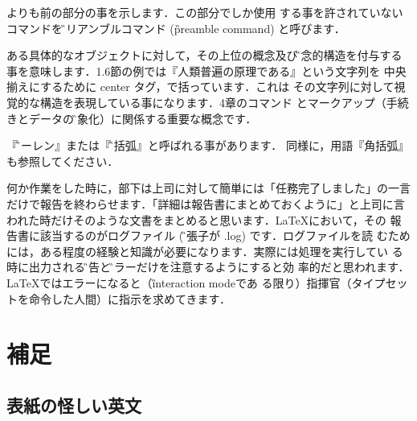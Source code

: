 \begin{description}
\verb|| よりも前の部分の事を示します．この部分でしか使用
する事を許されていないコマンドを\G{プリアンブルコマンド}
 (\G{preamble command}) と呼びます．

\end{description}
\begin{description}
ある具体的なオブジェクトに対して，その上位の概念及び\G{概念的構造}を付与する
事を意味します．1.6節の例では『人類普遍の原理である』という文字列を
中央揃えにするために center タグ，で括っています．これは
その文字列に対して視覚的な構造を表現している事になります．4章のコマンド
とマークアップ（手続きとデータの\G{抽象化}）に関係する重要な概念です．

『\G{パーレン}』または『\G{小括弧}』と呼ばれる事があります．
同様に，用語『角括弧』も参照してください．

\end{description}
%
\begin{description}
何か作業をした時に，部下は上司に対して簡単には「任務完了しました」の一言
だけで報告を終わらせます．「詳細は報告書にまとめておくように」と上司に言
われた時だけそのような文書をまとめると思います．\LaTeX において，その
報告書に該当するのがログファイル (\G{拡張子}が .log) です．ログファイルを読
むためには，ある程度の経験と知識が必要になります．実際には処理を実行してい
る時に出力される\G{警告}と\G{エラー}だけを注意するようにすると効
率的だと思われます．\LaTeX ではエラーになると（\G{interaction mode}であ
る限り）指揮官（タイプセットを命令した人間）に指示を求めてきます．
\end{description}
%

\onecolumn

\section{補足}

\subsection{表紙の怪しい英文}

